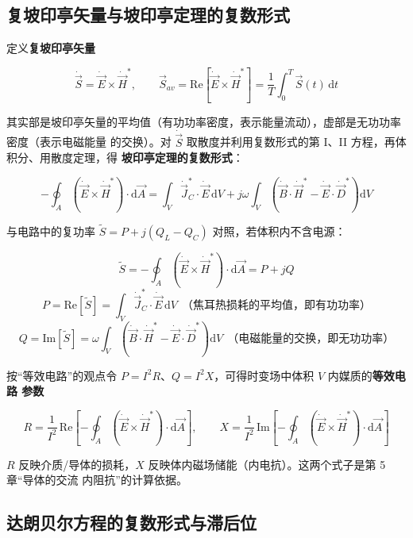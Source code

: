 \subsection{复坡印亭矢量与坡印亭定理的复数形式}

定义\textbf{复坡印亭矢量}
\begin{formulaBox}
\[
\dot{\vec{S}}=\dot{\vec{E}}\times\dot{\vec{H}}^{*},
\qquad
\vec{S}_{av}=\mathrm{Re}\left[\dot{\vec{E}}\times\dot{\vec{H}}^{*}\right]
=\frac{1}{T}\int_{0}^{T}\vec{S}(t)\,\mathrm{d}t
\]
\end{formulaBox}
其实部是坡印亭矢量的平均值（有功功率密度，表示能量流动），虚部是无功功率密度（表示电磁能量
的交换）。对 $\dot{\vec{S}}$ 取散度并利用复数形式的第 I、II 方程，再体积分、用散度定理，得
\textbf{坡印亭定理的复数形式}：
\begin{formulaBox}
\[
-\oint_{A}\left(\dot{\vec{E}}\times\dot{\vec{H}}^{*}\right)\cdot \mathrm{d}\vec{A}
=\int_{V}\dot{\vec{J}}_C^{*}\cdot\dot{\vec{E}}\,\mathrm{d}V
+j\omega\int_{V}\left(\dot{\vec{B}}\cdot\dot{\vec{H}}^{*}
-\dot{\vec{E}}\cdot\dot{\vec{D}}^{*}\right)\mathrm{d}V
\]
\end{formulaBox}
与电路中的复功率 $\tilde{S}=P+j(Q_L-Q_C)$ 对照，若体积内不含电源：
\begin{formulaBox}
\[
\tilde{S}=-\oint_{A}\left(\dot{\vec{E}}\times\dot{\vec{H}}^{*}\right)\cdot \mathrm{d}\vec{A}
=P+jQ
\]
\[
P=\mathrm{Re}[\tilde{S}]=\int_{V}\dot{\vec{J}}_C^{*}\cdot\dot{\vec{E}}\,\mathrm{d}V
\ \ \text{（焦耳热损耗的平均值，即有功功率）}
\]
\[
Q=\mathrm{Im}[\tilde{S}]
=\omega\int_{V}\left(\dot{\vec{B}}\cdot\dot{\vec{H}}^{*}
-\dot{\vec{E}}\cdot\dot{\vec{D}}^{*}\right)\mathrm{d}V
\ \ \text{（电磁能量的交换，即无功功率）}
\]
\end{formulaBox}

按“等效电路”的观点令 $P=I^{2}R$、$Q=I^{2}X$，可得时变场中体积 $V$ 内媒质的\textbf{等效电路
参数}
\begin{formulaBox}
\[
R=\frac{1}{I^{2}}\,\mathrm{Re}\left[-\oint_{A}
\left(\dot{\vec{E}}\times\dot{\vec{H}}^{*}\right)\cdot \mathrm{d}\vec{A}\right],
\qquad
X=\frac{1}{I^{2}}\,\mathrm{Im}\left[-\oint_{A}
\left(\dot{\vec{E}}\times\dot{\vec{H}}^{*}\right)\cdot \mathrm{d}\vec{A}\right]
\]
\end{formulaBox}
$R$ 反映介质/导体的损耗，$X$ 反映体内磁场储能（内电抗）。这两个式子是第 5 章“导体的交流
内阻抗”的计算依据。

\subsection{达朗贝尔方程的复数形式与滞后位}

